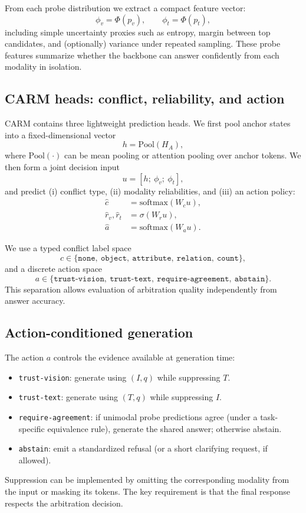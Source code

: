 \documentclass{article}
\begin{document}
From each probe distribution we extract a compact feature vector:
\[
\phi_v = \Phi(p_v), \qquad \phi_t = \Phi(p_t),
\]
including simple uncertainty proxies such as entropy, margin between top candidates, and (optionally) variance under repeated sampling. These probe features summarize whether the backbone can answer confidently from each modality in isolation.

\subsection{CARM heads: conflict, reliability, and action}
CARM contains three lightweight prediction heads. We first pool anchor states into a fixed-dimensional vector
\[
h = \mathrm{Pool}(H_A),
\]
where $\mathrm{Pool}(\cdot)$ can be mean pooling or attention pooling over anchor tokens. We then form a joint decision input
\[
u = [h;\ \phi_v;\ \phi_t],
\]
and predict (i) conflict type, (ii) modality reliabilities, and (iii) an action policy:
\begin{align}
  \hat{c} &= \mathrm{softmax}(W_c u), \\
  \hat{r}_v, \hat{r}_t &= \sigma(W_r u), \\
  \hat{a} &= \mathrm{softmax}(W_a u).
\end{align}

We use a typed conflict label space
\[
c \in \{\texttt{none},\ \texttt{object},\ \texttt{attribute},\ \texttt{relation},\ \texttt{count}\},
\]
and a discrete action space
\[
a \in \{\texttt{trust-vision},\ \texttt{trust-text},\ \texttt{require-agreement},\ \texttt{abstain}\}.
\]
This separation allows evaluation of arbitration quality independently from answer accuracy.

\subsection{Action-conditioned generation}
The action $a$ controls the evidence available at generation time:
\begin{itemize}
  \item \texttt{trust-vision}: generate using $(I,q)$ while suppressing $T$.
  \item \texttt{trust-text}: generate using $(T,q)$ while suppressing $I$.
  \item \texttt{require-agreement}: if unimodal probe predictions agree (under a task-specific equivalence rule), generate the shared answer; otherwise abstain.
  \item \texttt{abstain}: emit a standardized refusal (or a short clarifying request, if allowed).
\end{itemize}
Suppression can be implemented by omitting the corresponding modality from the input or masking its tokens. The key requirement is that the final response respects the arbitration decision.
\end{document}
